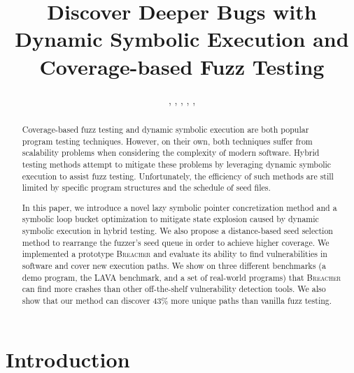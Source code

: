 \documentclass{cta-author}
\newcommand{\prototype}{\textsc{Breacher} }
\begin{document}

\title{Discover Deeper Bugs with Dynamic Symbolic Execution 
	and Coverage-based Fuzz Testing}

\author{, 
	, 
	, 
	, 
	, 
	}
%
\address{
}

\begin{abstract}
Coverage-based fuzz testing and dynamic symbolic execution are both 
popular program testing techniques. However, on their own, both techniques 
suffer from scalability problems when considering the complexity of 
modern software. Hybrid testing methods attempt to mitigate these 
problems by leveraging dynamic symbolic execution to assist fuzz 
testing. Unfortunately, the efficiency of such methods are still 
limited by specific program structures and the schedule of seed files.

In this paper, we introduce a novel lazy symbolic pointer concretization 
method and a symbolic loop bucket optimization to mitigate state explosion 
caused by dynamic symbolic execution in hybrid testing.
We also propose a distance-based seed selection method to rearrange the 
fuzzer's seed queue in order to achieve higher coverage. We implemented 
a prototype \prototype and evaluate its ability to find vulnerabilities in software 
and cover new execution paths. We show on three different benchmarks (a 
demo program, the LAVA benchmark, and a set of real-world programs) that 
\prototype can find more crashes than other off-the-shelf vulnerability 
detection tools. We also show that our method can discover 43\% more 
unique paths than vanilla fuzz testing.
\end{abstract}

\maketitle

\section{Introduction} \label{sec:introduction}

\end{document}
